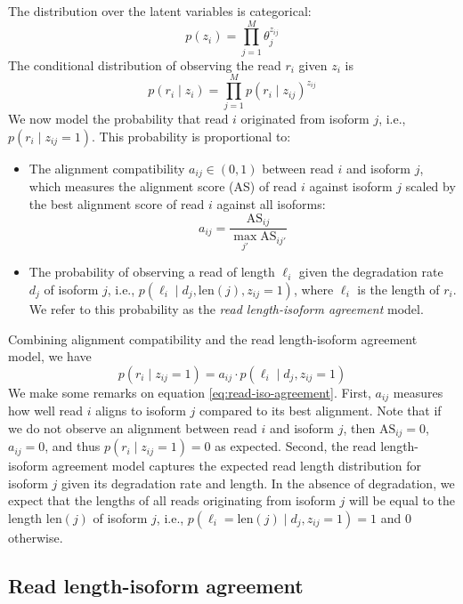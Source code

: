 \noindent The distribution over the latent variables is categorical:
\begin{equation}
    p(z_i)=\prod_{j=1}^M \theta_j^{z_{ij}}\label{eq:latent-dist}
\end{equation}
The conditional distribution of observing the read $r_i$ given $z_i$ is
\begin{equation}
    p(r_i\mid z_i)=\prod_{j=1}^M p(r_i\mid z_{ij})^{z_{ij}}\label{eq:cond-dist}
\end{equation}
We now model the probability that read $i$ originated from isoform $j$, i.e., $p(r_i\mid z_{ij}=1)$. This probability is proportional to:
\begin{itemize}
    \item The alignment compatibility $a_{ij}\in(0,1)$ between read $i$ and isoform $j$, which measures the alignment score (AS) of read $i$ against isoform $j$ scaled by the best alignment score of read $i$ against all isoforms:
    \begin{equation}
        a_{ij} = \frac{{\textrm{AS}}_{ij}}{\max_{j'} {\textrm{AS}}_{ij'}}
    \end{equation}
    \item The probability of observing a read of length $\ell_i$ given the degradation rate $d_j$ of isoform $j$, i.e., $p(\ell_i\mid d_j, \mathrm{len}(j), z_{ij}=1)$, where $\ell_i$ is the length of $r_i$. We refer to this probability as the \textit{read length-isoform agreement} model.      
\end{itemize}
Combining alignment compatibility and the read length-isoform agreement model, we have 
\begin{equation}
    p(r_i\mid z_{ij}=1) = a_{ij}\cdot p(\ell_i\mid d_j, z_{ij}=1)\label{eq:read-iso-agreement}
\end{equation}
We make some remarks on equation \ref{eq:read-iso-agreement}. First, $a_{ij}$ measures how well read $i$ aligns to isoform $j$ compared to its best alignment. Note that if we do not observe an alignment between read $i$ and isoform $j$, then $\mathrm{AS}_{ij}=0$, $a_{ij}=0$, and thus $p(r_i\mid z_{ij}=1)=0$ as expected. Second, the read length-isoform agreement model captures the expected read length distribution for isoform $j$ given its degradation rate and length. In the absence of degradation, we expect that the lengths of all reads originating from isoform $j$ will be equal to the length len$(j)$ of isoform $j$, i.e., $p(\ell_i=\mathrm{len}(j)\mid d_j, z_{ij}=1)=1$ and $0$ otherwise.   

\subsection{Read length-isoform agreement}\label{sec:read-length-isoform-agreement}

